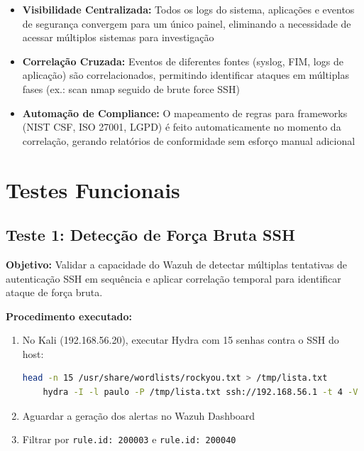 \documentclass[12pt,a4paper]{article}
\begin{document}
    \begin{itemize}
        \item \textbf{Visibilidade Centralizada:} Todos os logs do sistema, aplicações e eventos de segurança convergem para um único painel, eliminando a necessidade de acessar múltiplos sistemas para investigação
        \item \textbf{Correlação Cruzada:} Eventos de diferentes fontes (syslog, FIM, logs de aplicação) são correlacionados, permitindo identificar ataques em múltiplas fases (ex.: scan nmap seguido de brute force SSH)
        \item \textbf{Automação de Compliance:} O mapeamento de regras para frameworks (NIST CSF, ISO 27001, LGPD) é feito automaticamente no momento da correlação, gerando relatórios de conformidade sem esforço manual adicional
    \end{itemize}

    \newpage
    \section{Testes Funcionais}

    \subsection{Teste 1: Detecção de Força Bruta SSH}

    \textbf{Objetivo:} Validar a capacidade do Wazuh de detectar múltiplas tentativas de autenticação SSH em sequência e aplicar correlação temporal para identificar ataque de força bruta.

    \textbf{Procedimento executado:}
    \begin{enumerate}
        \item No Kali (192.168.56.20), executar Hydra com 15 senhas contra o SSH do host:
    \begin{lstlisting}[language=bash]
    head -n 15 /usr/share/wordlists/rockyou.txt > /tmp/lista.txt
    hydra -I -l paulo -P /tmp/lista.txt ssh://192.168.56.1 -t 4 -V
    \end{lstlisting}
        \item Aguardar a geração dos alertas no Wazuh Dashboard
        \item Filtrar por \texttt{rule.id: 200003} e \texttt{rule.id: 200040}
    \end{enumerate}
\end{document}
